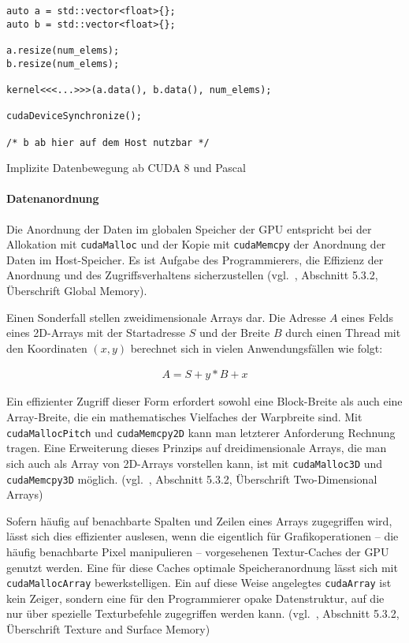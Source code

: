 \begin{code}
    \begin{verbatim}
auto a = std::vector<float>{};
auto b = std::vector<float>{};

a.resize(num_elems);
b.resize(num_elems);

kernel<<<...>>>(a.data(), b.data(), num_elems);

cudaDeviceSynchronize();

/* b ab hier auf dem Host nutzbar */
    \end{verbatim}
    \caption{Implizite Datenbewegung ab CUDA 8 und Pascal}
    \label{vergleich:cuda:datensicht:explizitcuda8}
\end{code}

\paragraph{Datenanordnung}

Die Anordnung der Daten im globalen Speicher der GPU entspricht bei der
Allokation mit \texttt{cudaMalloc} und der Kopie mit
\texttt{cudaMemcpy} der Anordnung der Daten im Host-Speicher. Es ist
Aufgabe des Programmierers, die Effizienz der Anordnung und des
Zugriffsverhaltens sicherzustellen (vgl.~\cite{cudaguide}, Abschnitt 5.3.2,
Überschrift \glqq Global Memory\grqq).

Einen Sonderfall stellen zweidimensionale Arrays dar. Die Adresse $A$ eines
Felds eines 2D-Arrays mit der Startadresse $S$ und der Breite $B$ durch einen
Thread mit den Koordinaten $(x, y)$ berechnet sich in vielen Anwendungsfällen
wie folgt:

\begin{align*}
    A = S + y * B + x
\end{align*}

Ein effizienter Zugriff dieser Form erfordert sowohl eine Block-Breite als auch
eine Array-Breite, die ein mathematisches Vielfaches der Warpbreite sind. Mit
\texttt{cudaMallocPitch} und \texttt{cudaMemcpy2D} kann man
letzterer Anforderung Rechnung tragen. Eine Erweiterung dieses Prinzips auf
dreidimensionale Arrays, die man sich auch als Array von 2D-Arrays vorstellen
kann, ist mit \texttt{cudaMalloc3D} und \texttt{cudaMemcpy3D}
möglich. (vgl.~\cite{cudaguide}, Abschnitt 5.3.2, Überschrift \glqq
Two-Dimensional Arrays\grqq)

Sofern häufig auf benachbarte Spalten und Zeilen eines Arrays zugegriffen
wird, lässt sich dies effizienter auslesen, wenn die eigentlich für
Grafikoperationen -- die häufig benachbarte Pixel manipulieren -- vorgesehenen
Textur-Caches der GPU genutzt werden. Eine für diese Caches optimale
Speicheranordnung lässt sich mit \texttt{cudaMallocArray}
bewerkstelligen. Ein auf diese Weise angelegtes \texttt{cudaArray} ist
kein Zeiger, sondern eine für den Programmierer opake Datenstruktur, auf die
nur über spezielle Texturbefehle zugegriffen werden kann.
(vgl.~\cite{cudaguide}, Abschnitt 5.3.2, Überschrift \glqq Texture and Surface
Memory\grqq)

